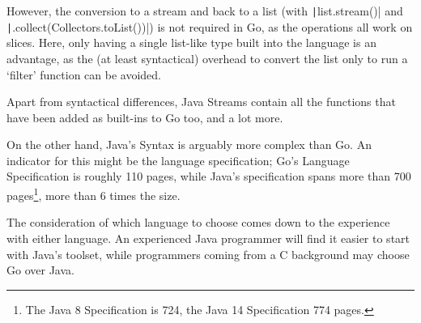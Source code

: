 

However, the conversion to a stream and back to a list (with \texttt|list.stream()| and
\texttt|.collect(Collectors.toList())|)
is not required in Go, as the operations all work on slices. Here, only having a single
list-like type built into the language is an advantage, as the (at least syntactical)
overhead to convert the list only to run a `filter' function can be avoided.

Apart from syntactical differences, Java Streams contain all the functions that
have been added as built-ins to Go too, and a lot more.

On the other hand, Java's Syntax is arguably more complex than Go. An indicator for this might be
the language specification; Go's Language Specification is roughly 110 pages, while
Java's specification spans more than 700 pages\footnote{
	The Java 8 Specification is 724\autocite{java-8-spec}, the Java 14
	Specification 774\autocite{java-14-spec} pages.}, more than 6 times the size.

The consideration of which language to choose comes down to the experience with either language.
An experienced Java programmer will find it easier to start with Java's toolset, while programmers
coming from a C background may choose Go over Java.

